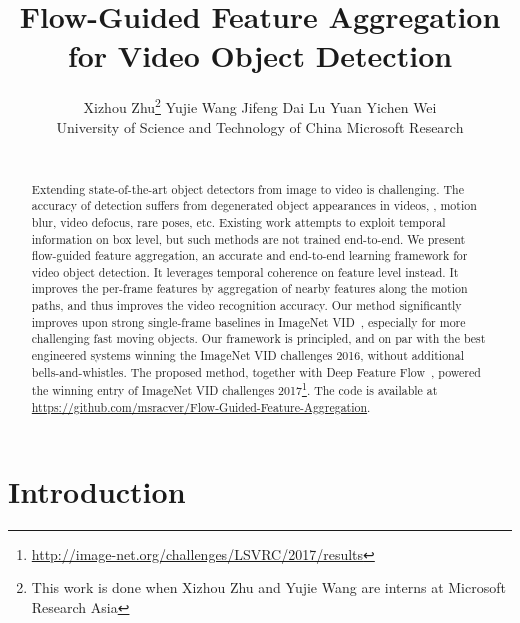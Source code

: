 \documentclass[10pt,twocolumn,letterpaper]{article}
\begin{document}
\title{Flow-Guided Feature Aggregation for Video Object Detection}

\author{Xizhou Zhu\thanks{This work is done when Xizhou Zhu and Yujie Wang are interns at Microsoft Research Asia} \qquad Yujie Wang \qquad Jifeng Dai \qquad Lu Yuan \qquad Yichen Wei \vspace{8pt}\\
	University of Science and Technology of China \qquad\qquad Microsoft Research\qquad\qquad\\
	\hspace{0.7in}{\tt\small ezra0408@mail.ustc.edu.cn} \qquad{} \qquad\\
}



\maketitle


\begin{abstract}  
Extending state-of-the-art object detectors from image to video is challenging. The accuracy of detection suffers from degenerated object appearances in videos, \eg, motion blur, video defocus, rare poses, etc. Existing work attempts to exploit temporal information on box level, but such methods are not trained end-to-end. We present flow-guided feature aggregation, an accurate and end-to-end learning framework for video object detection. It leverages temporal coherence on feature level instead. It improves the per-frame features by aggregation of nearby features along the motion paths, and thus improves the video recognition accuracy. Our method significantly improves upon strong single-frame baselines in ImageNet VID~\cite{russakovsky2015imagenet}, especially for more challenging fast moving objects. Our framework is principled, and on par with the best engineered systems winning the ImageNet VID challenges 2016, without additional bells-and-whistles. The proposed method, together with Deep Feature Flow~\cite{zhu2016dff}, powered the winning entry of ImageNet VID challenges 2017\footnote{\url{http://image-net.org/challenges/LSVRC/2017/results}}. The code is available at \url{https://github.com/msracver/Flow-Guided-Feature-Aggregation}.
\end{abstract}

\section{Introduction}
\end{document}
